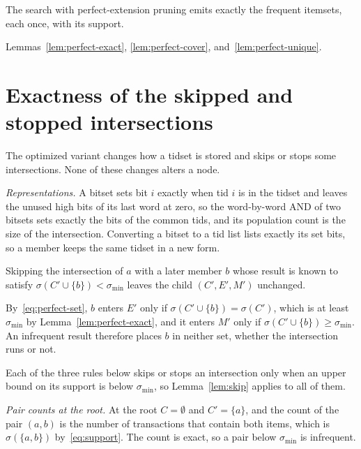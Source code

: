 \begin{theorem}
\label{thm:perfect}
The search with perfect-extension pruning emits exactly the frequent itemsets, each once,
with its support.
\end{theorem}
\begin{IEEEproof}
Lemmas~\ref{lem:perfect-exact}, \ref{lem:perfect-cover}, and~\ref{lem:perfect-unique}.
\end{IEEEproof}

\section{Exactness of the skipped and stopped intersections}
\label{app:skips}
The optimized variant changes how a tidset is stored and skips or stops some
intersections. None of these changes alters a node.

\emph{Representations.} A bitset sets bit $i$ exactly when tid $i$ is in the tidset and
leaves the unused high bits of its last word at zero, so the word-by-word AND of two
bitsets sets exactly the bits of the common tids, and its population count is the size of
the intersection. Converting a bitset to a tid list lists exactly its set bits, so a
member keeps the same tidset in a new form.

\begin{lemma}
\label{lem:skip}
Skipping the intersection of $a$ with a later member $b$ whose result is known to satisfy
$\sigma(C' \cup \{b\}) < \sigma_{\min}$ leaves the child $(C', E', M')$ unchanged.
\end{lemma}
\begin{IEEEproof}
By~\eqref{eq:perfect-set}, $b$ enters $E'$ only if $\sigma(C' \cup \{b\}) = \sigma(C')$,
which is at least $\sigma_{\min}$ by Lemma~\ref{lem:perfect-exact}, and it enters $M'$
only if $\sigma(C' \cup \{b\}) \ge \sigma_{\min}$. An infrequent result therefore places
$b$ in neither set, whether the intersection runs or not.
\end{IEEEproof}

Each of the three rules below skips or stops an intersection only when an upper bound on
its support is below $\sigma_{\min}$, so Lemma~\ref{lem:skip} applies to all of them.

\emph{Pair counts at the root.} At the root $C = \emptyset$ and $C' = \{a\}$, and the
count of the pair $(a, b)$ is the number of transactions that contain both items, which
is $\sigma(\{a, b\})$ by~\eqref{eq:support}. The count is exact, so a pair below
$\sigma_{\min}$ is infrequent.

